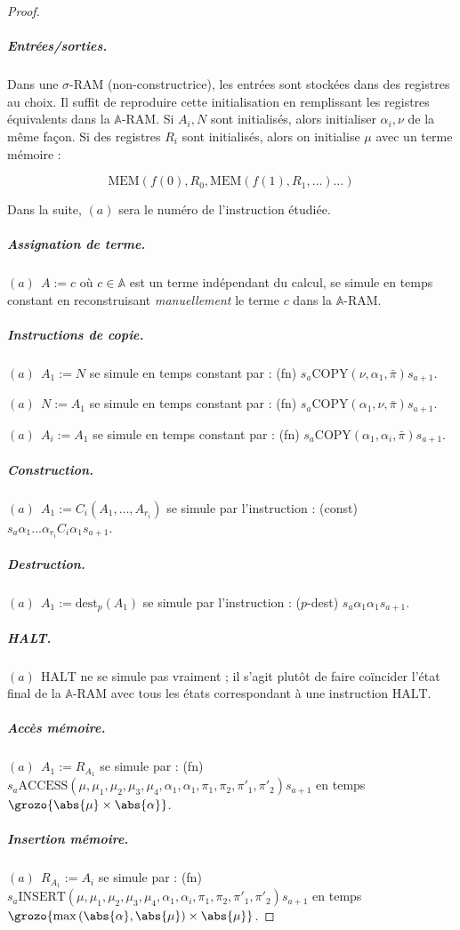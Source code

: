 \documentclass{report}
\newcommand{\bbA}{\mathbb{A}}
\begin{document}
\begin{proof}
						\subparagraph{Entrées/sorties.}
						Dans une $\sigma$-RAM (non-constructrice), les entrées sont stockées dans des registres au choix. Il suffit de reproduire cette initialisation en remplissant les registres équivalents dans la $\bbA$-RAM. Si $A_i, N$ sont initialisés, alors initialiser $\alpha_i, \nu$ de la même façon. Si des registres $R_i$ sont initialisés, alors on initialise $\mu$ avec un terme mémoire : 
						
						\[
							\text{MEM}\left( f(0), R_0, \text{MEM}\left( f(1), R_1, \dots \right) \dots \right)
						\]
						
						Dans la suite, $(a)$ sera le numéro de l'instruction étudiée. 
						
						\subparagraph{Assignation de terme.}
						$(a) \:\: A := c$ où $c \in \bbA$ est un terme indépendant du calcul, se simule en temps constant en reconstruisant \emph{manuellement} le terme $c$ dans la $\bbA$-RAM. 
						
						\subparagraph{Instructions de copie.}
						$(a) \:\: A_1 := N$ se simule en temps constant par : (fn) $s_a \text{COPY}(\nu, \alpha_1, \bar{\pi}) s_{a+1}$.
						 
						$(a) \:\: N := A_1$ se simule en temps constant par : (fn) $s_a \text{COPY}(\alpha_1, \nu, \bar{\pi}) s_{a+1}$.
						
						$(a) \:\: A_i := A_1$ se simule en temps constant par : (fn) $s_a \text{COPY}(\alpha_1, \alpha_i, \bar{\pi}) s_{a+1}$.
					
						\subparagraph{Construction.}
						$(a) \:\: A_1 := C_i(A_1, \dots, A_{r_i})$ se simule par l'instruction : (const) $s_a \alpha_1 \dots \alpha_{r_i} C_i \alpha_1 s_{a+1}$.
						
						\subparagraph{Destruction.}
						$(a) \:\: A_1 := \text{dest}_p(A_1)$ se simule par l'instruction : ($p$-dest) $s_a \alpha_1 \alpha_1 s_{a+1}$.
						
						\subparagraph{HALT.}
						$(a) \:\: \text{HALT}$ ne se simule pas vraiment ; il s'agit plutôt de faire coïncider l'état final de la $\bbA$-RAM avec tous les états correspondant à une instruction $\text{HALT}$. 
						
						\subparagraph{Accès mémoire.}
						$(a) \:\: A_1 := R_{A_1}$ se simule par : (fn) $s_a \text{ACCESS}\left( \mu, \mu_1, \mu_2, \mu_3, \mu_4, \alpha_1, \alpha_1, \pi_1, \pi_2, \pi'_1, \pi'_2\right) s_{a+1}$ en temps $\grozo{\abs{\mu} \times \abs{\alpha}}$.
						
						\subparagraph{Insertion mémoire.}
						$(a) \:\: R_{A_1} := A_i$ se simule par : (fn) $s_a \text{INSERT}\left( \mu, \mu_1, \mu_2, \mu_3, \mu_4, \alpha_1, \alpha_i, \pi_1, \pi_2, \pi'_1, \pi'_2\right) s_{a+1}$ en temps $\grozo{\max\left( \abs{\alpha}, \abs{\mu} \right)\times \abs{\mu}}$. 
						

\end{proof}
\end{document}
